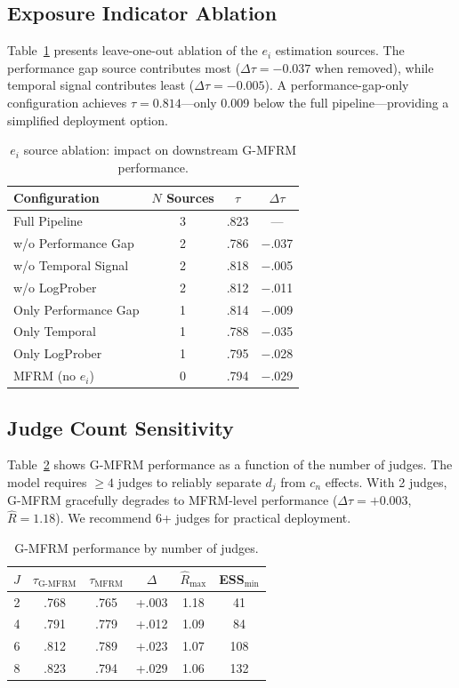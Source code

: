 \documentclass[letterpaper,11pt]{article}
\begin{document}
\subsection{Exposure Indicator Ablation}

Table~\ref{tab:ablation} presents leave-one-out ablation of the $e_i$ estimation sources. The performance gap source contributes most ($\Delta\tau = -0.037$ when removed), while temporal signal contributes least ($\Delta\tau = -0.005$). A performance-gap-only configuration achieves $\tau = 0.814$---only 0.009 below the full pipeline---providing a simplified deployment option.

\begin{table}[t]
\centering
\caption{$e_i$ source ablation: impact on downstream G-MFRM performance.}
\label{tab:ablation}
\small
\begin{tabular}{lccc}
\toprule
Configuration & $N$ Sources & $\tau$ & $\Delta\tau$ \\
\midrule
Full Pipeline & 3 & .823 & --- \\
w/o Performance Gap & 2 & .786 & $-$.037 \\
w/o Temporal Signal & 2 & .818 & $-$.005 \\
w/o LogProber & 2 & .812 & $-$.011 \\
Only Performance Gap & 1 & .814 & $-$.009 \\
Only Temporal & 1 & .788 & $-$.035 \\
Only LogProber & 1 & .795 & $-$.028 \\
MFRM (no $e_i$) & 0 & .794 & $-$.029 \\
\bottomrule
\end{tabular}
\end{table}

\subsection{Judge Count Sensitivity}

Table~\ref{tab:judge_count} shows G-MFRM performance as a function of the number of judges. The model requires $\geq 4$ judges to reliably separate $d_j$ from $c_n$ effects. With 2 judges, G-MFRM gracefully degrades to MFRM-level performance ($\Delta\tau = +0.003$, $\hat{R} = 1.18$). We recommend 6+ judges for practical deployment.

\begin{table}[t]
\centering
\caption{G-MFRM performance by number of judges.}
\label{tab:judge_count}
\small
\begin{tabular}{cccccc}
\toprule
$J$ & $\tau_{\text{G-MFRM}}$ & $\tau_{\text{MFRM}}$ & $\Delta$ & $\hat{R}_{\max}$ & ESS$_{\min}$ \\
\midrule
2 & .768 & .765 & +.003 & 1.18 & 41 \\
4 & .791 & .779 & +.012 & 1.09 & 84 \\
6 & .812 & .789 & +.023 & 1.07 & 108 \\
8 & .823 & .794 & +.029 & 1.06 & 132 \\
\bottomrule
\end{tabular}
\end{table}
\end{document}
